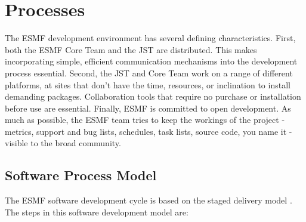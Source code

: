 
\section{Processes}
\label{sec:life_cycle}

The ESMF development environment has several defining characteristics.
First, both the ESMF Core Team and the JST are distributed.  This makes
incorporating simple, efficient communication mechanisms into the
development process essential.  Second, the JST and Core Team work on
a range of different platforms, at sites that don't have the time, resources,
or inclination to install demanding packages.  Collaboration
tools that require no purchase or installation before use are essential.
Finally, ESMF is committed to open development.  As much as possible, 
the ESMF team tries to keep the workings of the project - metrics,
support and bug lists, schedules, task lists, source code, you name it -
visible to the broad community.

\subsection{Software Process Model}

The ESMF software development cycle is based on the staged 
delivery model \cite{mcconnell96}.  The steps in this software development
model are:

